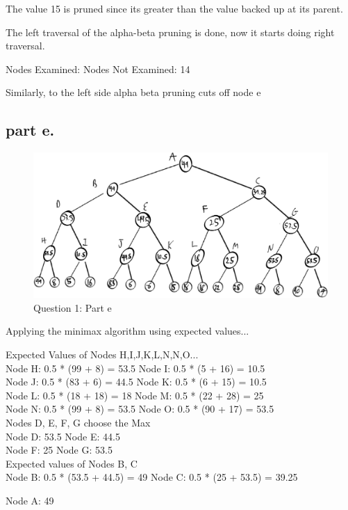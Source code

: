 The value 15 is pruned since its greater than the value backed up at its parent.

The left traversal of the alpha-beta pruning is done, now it starts doing right traversal.

Nodes Examined:
Nodes Not Examined: 14

Similarly, to the left side alpha beta pruning cuts off node e

\subsection{part e.}

\begin{figure}[H]
	\centering
  \includegraphics[scale = 0.65]{q1_part_e.png}
	\caption{Question 1: Part e}
	\label{fig: Q1 Part e}
\end{figure}

Applying the minimax algorithm using expected values...

\begin{center}
Expected Values of Nodes H,I,J,K,L,N,N,O... \\
Node H: 0.5 * (99 + 8)  = 53.5 \tab \tab
Node I: 0.5 * (5 + 16)  = 10.5 \\
Node J: 0.5 * (83 + 6)  = 44.5 \tab \tab
Node K: 0.5 * (6 + 15)  = 10.5 \\
Node L: 0.5 * (18 + 18) = 18   \tab \tab
Node M: 0.5 * (22 + 28) = 25   \\
Node N: 0.5 * (99 + 8)  = 53.5 \tab \tab
Node O: 0.5 * (90 + 17) = 53.5 \\

\newpage
Nodes D, E, F, G choose the Max \\
Node D: 53.5 \tab \tab
Node E: 44.5 \\
Node F: 25   \tab \tab
Node G: 53.5 \\

Expected values of Nodes B, C \\
Node B: 0.5 * (53.5 + 44.5) = 49 \tab \tab
Node C: 0.5 * (25 + 53.5)   = 39.25

Node A: 49
\end{center}

